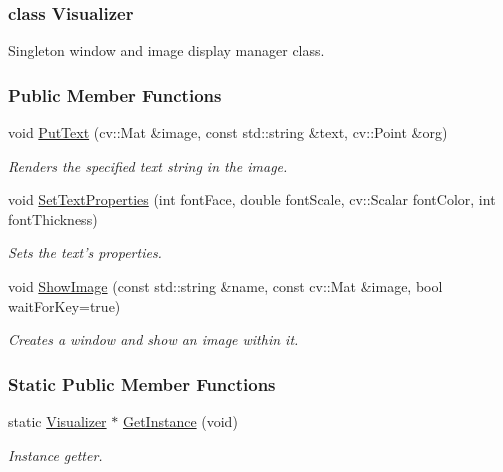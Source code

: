 \subsubsection{class Visualizer}
Singleton window and image display manager class. \subsubsection*{Public Member Functions}
\begin{DoxyCompactItemize}
\item 
void \hyperlink{group___core_a0287f07ff905b861c4ce10a9af90d9f4}{Put\-Text} (cv\-::\-Mat \&image, const std\-::string \&text, cv\-::\-Point \&org)
\begin{DoxyCompactList}\small\item\em Renders the specified text string in the image. \end{DoxyCompactList}\item 
void \hyperlink{group___core_a51483ef2ff4337305b7ca06728eb3f1f}{Set\-Text\-Properties} (int font\-Face, double font\-Scale, cv\-::\-Scalar font\-Color, int font\-Thickness)
\begin{DoxyCompactList}\small\item\em Sets the text's properties. \end{DoxyCompactList}\item 
void \hyperlink{group___core_a910624091174d29faaa5c958215e1fd6}{Show\-Image} (const std\-::string \&name, const cv\-::\-Mat \&image, bool wait\-For\-Key=true)
\begin{DoxyCompactList}\small\item\em Creates a window and show an image within it. \end{DoxyCompactList}\end{DoxyCompactItemize}
\subsubsection*{Static Public Member Functions}
\begin{DoxyCompactItemize}
\item 
static \hyperlink{group___core_class_visualizer}{Visualizer} $\ast$ \hyperlink{group___core_a8c905f72fdc7db2ecd53ffe473340bf7}{Get\-Instance} (void)
\begin{DoxyCompactList}\small\item\em Instance getter. \end{DoxyCompactList}\end{DoxyCompactItemize}
